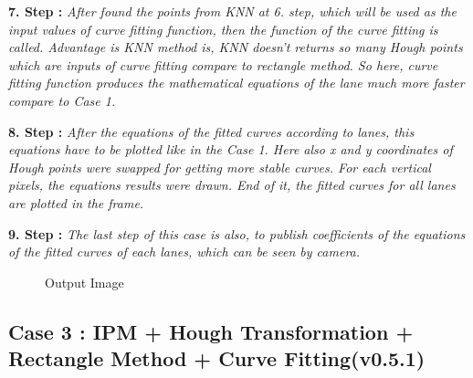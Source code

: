 \textbf{7. Step : }\emph{\color{blue}After found the points from KNN at 6. step, which will be used as the input values of curve fitting function, then the function of the curve fitting is called. Advantage is KNN method is, KNN doesn't returns so many Hough points which are inputs of curve fitting compare to rectangle method. So here, curve fitting function produces the mathematical equations of the lane much more faster compare to Case 1.} 

\textbf{8. Step : }\emph{\color{blue}After the equations of the fitted curves according to lanes, this equations have to be plotted like in the Case 1. Here also x and y coordinates of Hough points were swapped for getting more stable curves. For each vertical pixels, the equations results were drawn. End of it, the fitted curves for all lanes are plotted in the frame.}


\textbf{9. Step : }\emph{\color{blue}The last step of this case is also, to publish coefficients of the equations of the fitted curves of each lanes, which can be seen by camera.}


\begin{figure}[H]
  \centering
  \caption{Output Image}
\end{figure} 


\subsection{Case 3 : IPM + Hough Transformation + Rectangle Method + Curve Fitting(v0.5.1)}\label{sec:Case 3}

